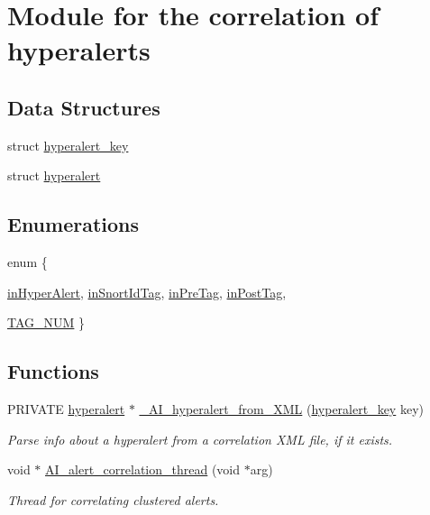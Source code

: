\hypertarget{group__correlation}{
\section{Module for the correlation of hyperalerts}
\label{group__correlation}
}
\subsection*{Data Structures}
\begin{DoxyCompactItemize}
\item 
struct \hyperlink{structhyperalert__key}{hyperalert\_\-key}
\item 
struct \hyperlink{structhyperalert}{hyperalert}
\end{DoxyCompactItemize}
\subsection*{Enumerations}
\begin{DoxyCompactItemize}
\item 
enum \{ \par
\hyperlink{group__correlation_gga06fc87d81c62e9abb8790b6e5713c55ba0b3b5f651ab0c6355666ff7b1c778af8}{inHyperAlert}, 
\hyperlink{group__correlation_gga06fc87d81c62e9abb8790b6e5713c55ba52d913c46f650f89a5da3ff4bfb7a45d}{inSnortIdTag}, 
\hyperlink{group__correlation_gga06fc87d81c62e9abb8790b6e5713c55ba828f2ec4acb20bae9b9c9fb0c5e0881f}{inPreTag}, 
\hyperlink{group__correlation_gga06fc87d81c62e9abb8790b6e5713c55baf6430d8e5b9791cca74ec3b325a8339f}{inPostTag}, 
\par
\hyperlink{group__correlation_gga06fc87d81c62e9abb8790b6e5713c55ba551d1861515058fbfe34955d4170ae67}{TAG\_\-NUM}
 \}
\end{DoxyCompactItemize}
\subsection*{Functions}
\begin{DoxyCompactItemize}
\item 
PRIVATE \hyperlink{structhyperalert}{hyperalert} $\ast$ \hyperlink{group__correlation_gacb46174cec5a2cce0a9bb1ca2b0f6850}{\_\-AI\_\-hyperalert\_\-from\_\-XML} (\hyperlink{structhyperalert__key}{hyperalert\_\-key} key)
\begin{DoxyCompactList}\small\item\em Parse info about a hyperalert from a correlation XML file, if it exists. \item\end{DoxyCompactList}\item 
void $\ast$ \hyperlink{group__correlation_ga939353a4e15de7a8f4145ab986f584be}{AI\_\-alert\_\-correlation\_\-thread} (void $\ast$arg)
\begin{DoxyCompactList}\small\item\em Thread for correlating clustered alerts. \item\end{DoxyCompactList}\end{DoxyCompactItemize}
